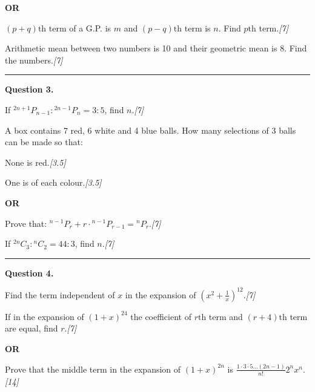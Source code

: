 \documentclass[11pt,a4paper]{article}
\newcommand{\pts}[1]{\hfill   \textit{[#1]}}
\begin{document}
\centerline{   \textbf{OR}}


\begin{parts}
  \item $(p+q) \text{th}$ term of a G.P. is $m$ and $(p-q) \text{th}$ term is $n$. Find $p \text{th}$ term.\pts{7}
  \item Arithmetic mean between two numbers is 10 and their geometric mean is 8. Find the numbers.\pts{7}
\end{parts}

\medskip\rule{\linewidth}{0.2pt}




\noindent   \textbf{Question 3.}

\begin{parts}
  \item If ${}^{2n+1}P_{n-1} : {}^{2n-1}P_n = 3:5$, find $n$.\pts{7}
  \item A box contains 7 red, 6 white and 4 blue balls. How many selections of 3 balls can be made so that:
  
\begin{parts}
    \item None is red.\pts{3.5}
    \item One is of each colour.\pts{3.5}
  \end{parts}
\end{parts}

\centerline{   \textbf{OR}}


\begin{parts}
  \item Prove that: ${}^{n-1}P_r + r \cdot {}^{n-1}P_{r-1} = {}^nP_r$.\pts{7}
  \item If ${}^{2n}C_3 : {}^nC_2 = 44:3$, find $n$.\pts{7}
\end{parts}

\medskip\rule{\linewidth}{0.2pt}




\noindent   \textbf{Question 4.}

\begin{parts}
  \item Find the term independent of $x$ in the expansion of $\left(x^2 + \frac{1}{x}\right)^{12}$.\pts{7}
  \item If in the expansion of $(1+x)^{24}$ the coefficient of $r \text{th}$ term and $(r+4) \text{th}$ term are equal, find $r$.\pts{7}
\end{parts}

\centerline{   \textbf{OR}}

Prove that the middle term in the expansion of $(1+x)^{2n}$ is $\frac{1 \cdot 3 \cdot 5 \dots (2n-1)}{n!} 2^n x^n$.\pts{14}
\end{document}
